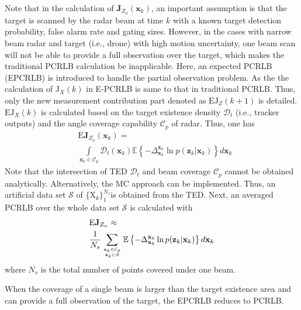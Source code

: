\documentclass[12pt,journal,draftclsnofoot,onecolumn]{IEEEtran}
\begin{document}
Note that in the calculation of $\mathbf{J}_{Z_{n}}(\mathbf{x}_k)$, an important assumption is that the target is scanned by the radar beam at time $k$ with a known target detection probability, false alarm rate and gating sizes. However, in the cases with narrow beam radar and target (i.e., drone) with high motion uncertainty, one beam scan will not be able to provide a full observation over the target, which makes the traditional PCRLB calculation be inapplicable. Here, an expected PCRLB (EPCRLB) is introduced to handle the partial observation problem. As the the calculation of $\mathrm{J}_{X}(k)$ in E-PCRLB is same to that in traditional PCRLB. Thus, only the new measurement contribution part denoted as $\mathrm{EJ}_{Z}(k+1)$ is detailed. $\mathrm{EJ}_{X}(k)$ is calculated based on the target existence density $\mathcal{D}_{t}$ (i.e., tracker outputs) and the angle coverage capability $\mathcal{C}_p$ of radar. Thus, one has
\begin{equation}
	\begin{aligned}
		&\text{E}\mathbf{J}_{Z_{n}}(\mathbf{x}_k)=\\
		&\int\limits_{\mathbf{x}_{k}\in \mathcal{C}_p}\mathcal{D}_{t}(\mathbf{x}_{k})\mathbb{E}\left \{{ -\Delta _{ \mathbf{x}_{k}}^{ \mathbf{x}_{k}}\ln p( {\mathbf{z}_{k}}| \mathbf{x}_{k}) }\right \} d\mathbf{x}_{k}
	\end{aligned}
	\label{EJZ_1}
\end{equation}
Note that the intersection of TED $\mathcal{D}_{t}$ and beam coverage $\mathcal{C}_{p}$ cannot be obtained analytically. Alternatively, the MC approach can be implemented. Thus, an artificial data set $\mathcal{S} $ of $\{\mathrm{ X}_k\}_{1}^{N_s}$is obtained from the TED. Next, an averaged PCRLB over the whole data set $\mathcal{S}$ is calculated with 
\begin{equation}
	\begin{aligned}
		&\text{E}\mathbf{J}_{Z_{n}}\approx\\
		&\frac{1}{N_s}\sum\limits_{{\mathbf{x}_{k}\in \mathcal{C}_p}\atop {\mathbf{x}_{k}\in \mathcal{S}}}\mathbb {E}\left \{{ -\Delta _{ \mathbf{x}_{k}}^{ \mathbf{x}_{k}}\ln p( {\mathbf{z}_{k}}| \mathbf{x}_{k}) }\right \} d\mathbf{x}_{k}
	\end{aligned}
	\label{EJZ_2}
\end{equation} 
where ${N}_s$ is the total number of points covered under one beam.

When the coverage of a single beam is larger than the target existence area and can provide a full observation of the target, the EPCRLB reduces to PCRLB.
\end{document}

